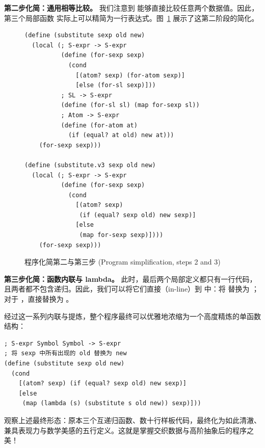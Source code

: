 \textbf{第二步化简：通用相等比较。} 我们注意到  能够直接比较任意两个数据值。因此，第三个局部函数  实际上可以精简为一行表达式。图~\ref{fig:122} 展示了这第二阶段的简化。

\begin{figure}[htbp]
  \centering
\begin{lstlisting}[language=BSL, basicstyle=\scriptsize\ttfamily]
(define (substitute sexp old new)
  (local (; S-expr -> S-expr
          (define (for-sexp sexp)
            (cond
              [(atom? sexp) (for-atom sexp)]
              [else (for-sl sexp)]))
          ; SL -> S-expr
          (define (for-sl sl) (map for-sexp sl))
          ; Atom -> S-expr
          (define (for-atom at)
            (if (equal? at old) new at)))
    (for-sexp sexp)))

(define (substitute.v3 sexp old new)
  (local (; S-expr -> S-expr
          (define (for-sexp sexp)
            (cond
              [(atom? sexp)
               (if (equal? sexp old) new sexp)]
              [else
               (map for-sexp sexp)])))
    (for-sexp sexp)))
\end{lstlisting}
  \caption{程序化简第二与第三步 (Program simplification, steps 2 and 3)}
  \label{fig:122}
\end{figure}

\textbf{第三步化简：函数内联与 lambda。} 此时，最后两个局部定义都只有一行代码，且两者都不包含递归。因此，我们可以将它们直接（in-line）到  中：将  替换为 ；对于 ，直接替换为 。

经过这一系列内联与提炼，整个程序最终可以优雅地浓缩为一个高度精炼的单函数结构：

\begin{lstlisting}[language=BSL]
; S-expr Symbol Symbol -> S-expr
; 将 sexp 中所有出现的 old 替换为 new
(define (substitute sexp old new)
  (cond
    [(atom? sexp) (if (equal? sexp old) new sexp)]
    [else
     (map (lambda (s) (substitute s old new)) sexp)]))
\end{lstlisting}

观察上述最终形态：原本三个互递归函数、数十行样板代码，最终化为如此清澈、兼具表现力与数学美感的五行定义。这就是掌握交织数据与高阶抽象后的程序之美！
